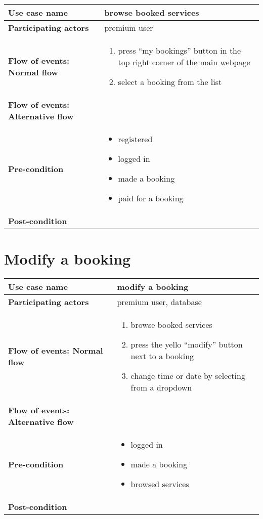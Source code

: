 \documentclass[a4paper, 13pt, draft]{report}
\begin{document}
\begin{center}
	\begin{tabular}{| >{\bf}l | p{5.55cm} |} 
		\hline
		Use case name & browse booked services \\ 
		\hline
		Participating actors & premium user \\
		\hline
		Flow of events: Normal flow & 
		\begin{enumerate}		
			\item press ``my bookings'' button in the top right corner of the main webpage
			\item select a booking from the list
		\end{enumerate}	\\
		\hline
		Flow of events: Alternative flow & \notapplicable \\
		\hline
		Pre-condition & 
		\begin{itemize} 
			\item registered
			\item logged in
			\item made a booking
			\item paid for a booking
		\end{itemize} \\
		\hline
		Post-condition & \notapplicable \\
		\hline
	\end{tabular}
\end{center}

\section*{Modify a booking}

\begin{center}
	\begin{tabular}{| >{\bf}l | p{5.55cm} |} 
		\hline
		Use case name & modify a booking \\ 
		\hline
		Participating actors & premium user, database \\
		\hline
		Flow of events: Normal flow & 
		\begin{enumerate}		
			\item browse booked services
			\item press the yello ``modify'' button next to a booking
			\item change time or date by selecting from a dropdown
		\end{enumerate}	\\
		\hline
		Flow of events: Alternative flow & \notapplicable \\
		\hline
		Pre-condition & 
		\begin{itemize} 
			\item logged in
			\item made a booking
			\item browsed services
		\end{itemize} \\
		\hline
		Post-condition & \notapplicable \\
		\hline
	\end{tabular}
\end{center}
\end{document}
